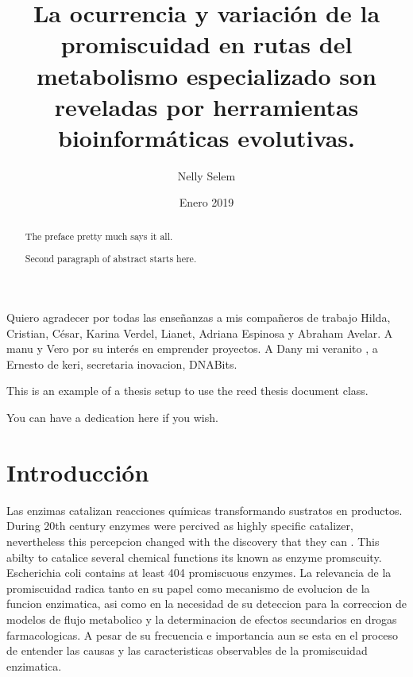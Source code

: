 \documentclass[12pt,twoside]{reedthesis}
\title{La ocurrencia y variación de la promiscuidad en rutas del metabolismo
especializado son reveladas por herramientas bioinformáticas evolutivas.}
\author{Nelly Selem}
\date{Enero 2019}
\begin{document}
      \maketitle
  
  \frontmatter %
  \pagestyle{empty} %

      \begin{acknowledgements}
      Quiero agradecer por todas las enseñanzas a mis compañeros de trabajo
      Hilda, Cristian, César, Karina Verdel, Lianet, Adriana Espinosa y
      Abraham Avelar. A manu y Vero por su interés en emprender proyectos. A
      Dany mi veranito , a Ernesto de keri, secretaria inovacion, DNABits.
    \end{acknowledgements}
  
      \begin{preface}
      This is an example of a thesis setup to use the reed thesis document
      class.
    \end{preface}
  
      \hypersetup{linkcolor=black}
    \setcounter{tocdepth}{3}
    \tableofcontents
  
      \listoftables
  
      \listoffigures
  
      \begin{abstract}
      The preface pretty much says it all. \par  Second paragraph of abstract
      starts here.
    \end{abstract}
  
      \begin{dedication}
      You can have a dedication here if you wish.
    \end{dedication}
  
  \mainmatter %
  \pagestyle{fancyplain} %

  \chapter*{Introducción}\label{introduccion}
  
  Las enzimas catalizan reacciones químicas transformando sustratos en
  productos. During 20th century enzymes were percived as highly specific
  catalizer, nevertheless this percepcion changed with the discovery that
  they can . This abilty to catalice several chemical functions its known
  as enzyme promscuity. Escherichia coli contains at least 404 promiscuous
  enzymes. La relevancia de la promiscuidad radica tanto en su papel como
  mecanismo de evolucion de la funcion enzimatica, asi como en la
  necesidad de su deteccion para la correccion de modelos de flujo
  metabolico y la determinacion de efectos secundarios en drogas
  farmacologicas. A pesar de su frecuencia e importancia aun se esta en el
  proceso de entender las causas y las caracteristicas observables de la
  promiscuidad enzimatica.
  
\end{document}

